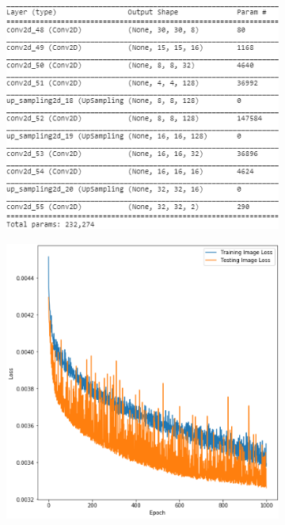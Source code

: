 \documentclass{l4proj}
\begin{document}
\begin{figure}[h]
    \centering
    \begin{subfigure}[b]{0.5\textwidth}
        \includegraphics[width=\textwidth]{images/FinalBasicModel.PNG}
        \caption{}
    \end{subfigure}
    \quad
    \begin{subfigure}[b]{0.41\textwidth}
        \includegraphics[width=\textwidth]{images/FinalBasicModelLoss.PNG}

\end{subfigure}
\end{figure}
\end{document}
